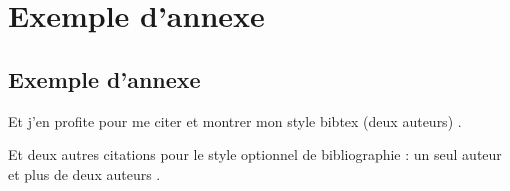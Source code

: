 \chapter{Exemple d'annexe}
\label{chap:annexe1}

\section{Exemple d'annexe}

Et j'en profite pour me citer et montrer mon style bibtex (deux auteurs) \cite{Commowick_MICCAI_2007}.

Et deux autres citations pour le style optionnel de bibliographie : un seul auteur \cite{Oakes_RStat_1999} et plus de deux auteurs \cite{Guimond_CVIU_2000}.